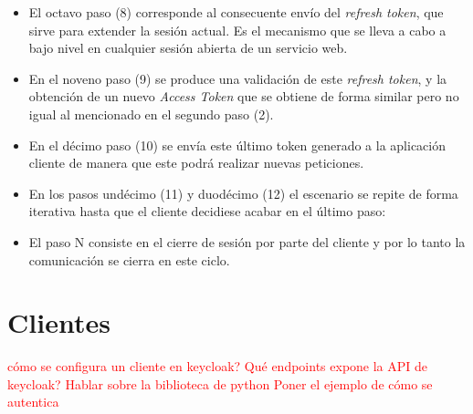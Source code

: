 \begin{itemize}
	\item El octavo paso (8) corresponde al consecuente envío del \textit{refresh token}, que sirve para extender la sesión actual. Es el mecanismo que se lleva a cabo a bajo nivel en cualquier sesión abierta de un servicio web.
	
	\item En el noveno paso (9) se produce una validación de este \textit{refresh token}, y la obtención de un nuevo \textit{Access Token} que se obtiene de forma similar pero no igual al mencionado en el segundo paso (2). 
	
	\item En el décimo paso (10) se envía este último token generado a la aplicación cliente de manera que este podrá realizar nuevas peticiones. 
	
	\item En los pasos undécimo (11) y duodécimo (12) el escenario se repite de forma
	iterativa hasta que el cliente decidiese acabar en el último paso: 
	
	\item El paso N consiste en el cierre de sesión por parte del cliente y por lo tanto la comunicación se cierra en este ciclo. 
	
\end{itemize}


\section*{Clientes}

\textcolor{red}{cómo se configura un cliente en keycloak?
Qué endpoints expone la API de keycloak?
Hablar sobre la biblioteca de python
Poner el ejemplo de cómo se autentica}

